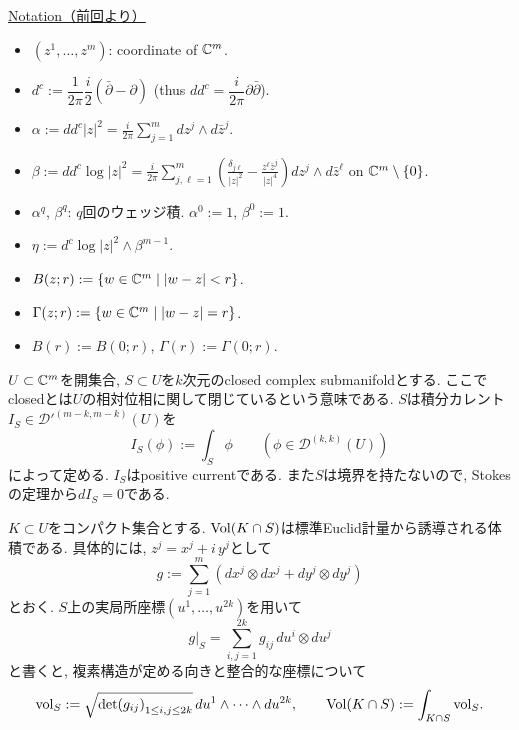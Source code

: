 \underline{Notation（前回より）}
\begin{itemize}
\item $(z^1,\ldots,z^m)$: coordinate of $\mathbb{C}^m$.
\item $d^c:=\dfrac{1}{2\pi}\dfrac{i}{2}(\bar\partial-\partial)$
\quad (thus $dd^c=\dfrac{i}{2\pi}\partial\bar\partial$).
\item $\displaystyle
\alpha:=dd^c|z|^2
=\frac{i}{2\pi}\sum_{j=1}^m dz^j\wedge d\bar z^j$.
\item $\displaystyle
\beta:=dd^c\log|z|^2
=\frac{i}{2\pi}\sum_{j,\ell=1}^m
\left(\frac{\delta_{j\ell}}{|z|^2}
-\frac{z^\ell\bar z^j}{|z|^4}\right)
dz^j\wedge d\bar z^\ell$
\quad on $\mathbb{C}^m\setminus\{0\}$.
\item $\alpha^q$, $\beta^q$: $q$回のウェッジ積.
\quad $\alpha^0:=1$, $\beta^0:=1$.
\item $\eta:=d^c\log|z|^2\wedge\beta^{m-1}$.
\item $B(z;r):=\{w\in\mathbb{C}^m\mid |w-z|<r\}$.
\item $\Gamma(z;r):=\{w\in\mathbb{C}^m\mid |w-z|=r\}$.
\item $B(r):=B(0;r)$, $\Gamma(r):=\Gamma(0;r)$.
\end{itemize}

$U\subset\mathbb{C}^m$を開集合,
$S\subset U$を$k$次元のclosed complex submanifoldとする.
ここでclosedとは$U$の相対位相に関して閉じているという意味である.
$S$は積分カレント
$I_S\in\mathcal{D}'^{(m-k,m-k)}(U)$を
\begin{equation*}
I_S(\phi):=\int_S\phi
\qquad
\left(\phi\in\mathcal{D}^{(k,k)}(U)\right)
\end{equation*}
によって定める. $I_S$はpositive currentである.
また$S$は境界を持たないので, Stokesの定理から$dI_S=0$である.

$K\subset U$をコンパクト集合とする.
$\operatorname{Vol}(K\cap S)$は標準Euclid計量から誘導される体積である.
具体的には, $z^j=x^j+i\,y^j$として
\begin{equation*}
g:=\sum_{j=1}^m
\left(dx^j\otimes dx^j+dy^j\otimes dy^j\right)
\end{equation*}
とおく. $S$上の実局所座標$(u^1,\ldots,u^{2k})$を用いて
\begin{equation*}
\left.g\right|_S
=\sum_{i,j=1}^{2k}g_{ij}\,du^i\otimes du^j
\end{equation*}
と書くと, 複素構造が定める向きと整合的な座標について
\begin{equation*}
\mathrm{vol}_S
:=\sqrt{\det(g_{ij})_{1\leq i,j\leq 2k}}\,
 du^1\wedge\cdots\wedge du^{2k},
\qquad
\operatorname{Vol}(K\cap S):=\int_{K\cap S}\mathrm{vol}_S.
\end{equation*}

